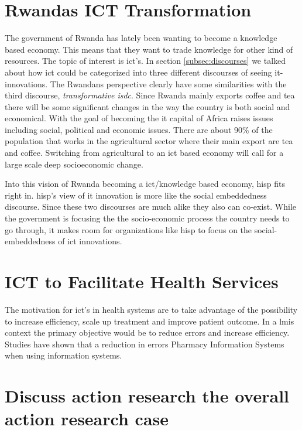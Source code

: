 \section{Rwandas ICT Transformation}
The government of Rwanda has lately been wanting to become a knowledge based economy. 
This means that they want to trade knowledge for other kind of resources. 
The topic of interest is \gls{ict}'s.
In section \ref{subsec:discourses} we talked about how \gls{ict} could be categorized into three different discourses of seeing \gls{it}-innovations. 
The Rwandans perspective clearly have some similarities with the third discourse, \textit{transformative \gls{isdc}}. 
Since Rwanda mainly exports coffee and tea there will be some significant changes in the way the country is both social and economical. 
With the goal of becoming the \gls{it} capital of Africa raises issues including social, political and economic issues. 
There are about 90\% of the population that works in the agricultural sector where their main export are tea and coffee. 
Switching from agricultural to an \gls{ict} based economy will call for a large scale deep socioeconomic change.

Into this vision of Rwanda becoming a \gls{ict}/knowledge based economy, \gls{hisp} fits right in.
\gls{hisp}'s view of \gls{it} innovation is more like the social embeddedness discourse.
Since these two discourses are much alike they also can co-exist. While the government is focusing the the socio-economic process the country needs to go through, it makes room for organizations like \gls{hisp} to focus on the social-embeddedness of \gls{ict} innovations.

\cite{overview:rdb}
\cite{rw:snl}

\section{ICT to Facilitate Health Services}
The motivation for \gls{ict}'s in health systems are to take advantage of the possibility to increase efficiency, scale up treatment and improve patient outcome. 
In a \gls{lmis} context the primary objective would be to reduce errors and increase efficiency.
Studies have shown that a reduction in errors Pharmacy Information Systems when using information systems. 

\cite{ehealth:blaya}

\section{Discuss action research the overall action research case}
